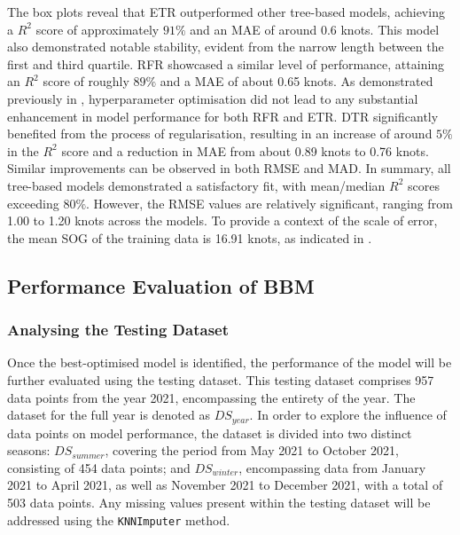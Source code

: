 The box plots reveal that ETR outperformed other tree-based models, achieving a $R^2$ score of approximately $91\%$ and an MAE of around 0.6 knots. This model also demonstrated notable stability, evident from the narrow length between the first and third quartile. RFR showcased a similar level of performance, attaining an $R^2$ score of roughly $89\%$ and a MAE of about 0.65 knots. As demonstrated previously in , hyperparameter optimisation did not lead to any substantial enhancement in model performance for both RFR and ETR. DTR significantly benefited from the process of regularisation, resulting in an increase of around $5\%$ in the $R^2$ score and a reduction in MAE from about 0.89 knots to 0.76 knots. Similar improvements can be observed in both RMSE and MAD. In summary, all tree-based models demonstrated a satisfactory fit, with mean/median $R^2$ scores exceeding $80\%$. However, the RMSE values are relatively significant, ranging from 1.00 to 1.20 knots across the models. To provide a context of the scale of error, the mean SOG of the training data is 16.91 knots, as indicated in .\\

\subsection{Performance Evaluation of BBM}\label{sec:Perf_eval_BBM}

\subsubsection{Analysing the Testing Dataset}\label{sec:testing_data_analysis}

Once the best-optimised model is identified, the performance of the model will be further evaluated using the testing dataset. This testing dataset comprises 957 data points from the year 2021, encompassing the entirety of the year. The dataset for the full year is denoted as $DS_{year}$. In order to explore the influence of data points on model performance, the dataset is divided into two distinct seasons: $DS_{summer}$, covering the period from May 2021 to October 2021, consisting of 454 data points; and $DS_{winter}$, encompassing data from January 2021 to April 2021, as well as November 2021 to December 2021, with a total of 503 data points. Any missing values present within the testing dataset will be addressed using the {\tt KNNImputer} method.\\

